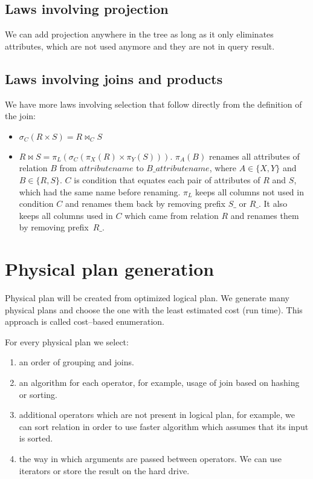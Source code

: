 \subsection{Laws involving projection}
We can add projection anywhere in the tree as long as it only eliminates attributes, which are not used anymore and they are not in query result.

\subsection{Laws involving joins and products}

We have more laws involving selection that follow directly from the definition of the join:
\begin{itemize}
\item $\sigma_{C}(R \times S)=R \Join_{C} S$
\item $R \Join S=\pi_L(\sigma_{C}(\pi_X(R) \times \pi_Y(S)))$. $\pi_A(B)$ renames all attributes of relation $B$ from $attributename$ to $B\_attributename$, where $A\in\{X,Y\}$ and $B\in\{R,S\}$. $C$ is condition that equates each pair of attributes of $R$ and $S$, which had the same name before renaming. $\pi_L$ keeps all columns not used in condition $C$ and renames them back by removing prefix $S\_$ or $R\_$. It also keeps all columns used in $C$ which came from relation $R$ and renames them by removing prefix~$R\_$.
\end{itemize}



\section{Physical plan generation}

Physical plan will be created from optimized logical plan. We generate many physical plans and choose the one with the least estimated cost (run time). This approach is called cost--based enumeration.

For every physical plan we select:
\begin{enumerate}
\item an order of grouping and joins.
\item an algorithm for each operator, for example, usage of join based on hashing or sorting.
\item additional operators which are not present in logical plan, for example, we can sort relation in order to use faster algorithm which assumes that its input is sorted.
\item the way in which arguments are passed between operators. We can use iterators  or store the result on the hard drive.
\end{enumerate}

